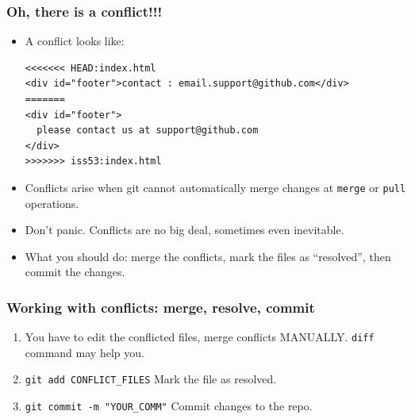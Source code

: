 \documentclass[11pt,ignorenonframetext,]{beamer}
\begin{document}
\begin{frame}[fragile, label=gitconflict]\frametitle{Oh, there is a conflict!!!}

\begin{itemize}
\item
  A conflict looks like:

{\small
\begin{verbatim}
<<<<<<< HEAD:index.html
<div id="footer">contact : email.support@github.com</div>
=======
<div id="footer">
  please contact us at support@github.com
</div>
>>>>>>> iss53:index.html
\end{verbatim}
}

\item
  Conflicts arise when git cannot automatically merge changes at
  \texttt{merge} or \texttt{pull} operations.
\item
  Don't panic. Conflicts are no big deal, sometimes even inevitable.
\item
  What you should do: merge the conflicts, mark the files as
  ``resolved'', then commit the changes.
\end{itemize}
\end{frame}

\begin{frame}[fragile]\frametitle{Working with conflicts: merge,
resolve, commit}

\begin{enumerate}[1.]
\item
  You have to edit the conflicted files, merge conflicts MANUALLY.
  \texttt{diff} command may help you.
\item
  \texttt{git add CONFLICT\_FILES} Mark the file as resolved.
\item
  \texttt{git commit -m "YOUR\_COMM"} Commit changes to the repo.
\end{enumerate}
\end{frame}
\end{document}
